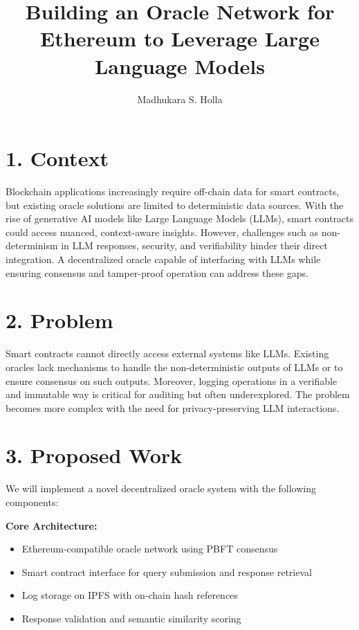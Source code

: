 \documentclass[12pt]{article}
\title{Building an Oracle Network for Ethereum to Leverage Large Language Models}
\author{Madhukara S. Holla}
\date{}
\begin{document}
\maketitle

\section*{1. Context}
Blockchain applications increasingly require off-chain data for smart contracts, but existing oracle solutions are limited to deterministic data sources. With the rise of generative AI models like Large Language Models (LLMs), smart contracts could access nuanced, context-aware insights. However, challenges such as non-determinism in LLM responses, security, and verifiability hinder their direct integration. A decentralized oracle capable of interfacing with LLMs while ensuring consensus and tamper-proof operation can address these gaps.

\section*{2. Problem}
Smart contracts cannot directly access external systems like LLMs. Existing oracles lack mechanisms to handle the non-deterministic outputs of LLMs or to ensure consensus on such outputs. Moreover, logging operations in a verifiable and immutable way is critical for auditing but often underexplored. The problem becomes more complex with the need for privacy-preserving LLM interactions.

\section*{3. Proposed Work}
We will implement a novel decentralized oracle system with the following components:

\textbf{Core Architecture:}
\begin{itemize}
    \item Ethereum-compatible oracle network using PBFT consensus
    \item Smart contract interface for query submission and response retrieval
    \item Log storage on IPFS with on-chain hash references
    \item Response validation and semantic similarity scoring
\end{itemize}
\end{document}
